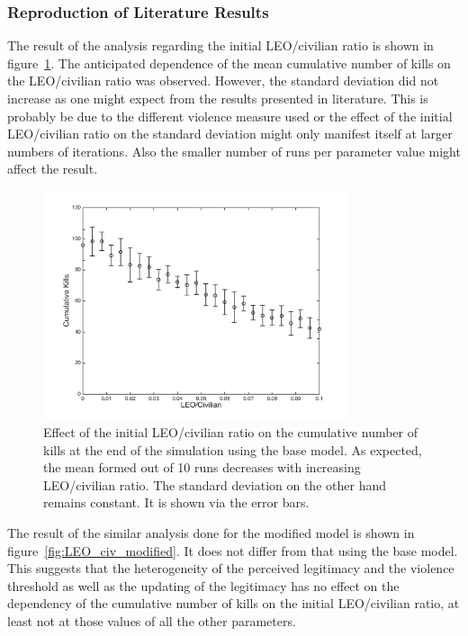 \documentclass[11pt]{article}
\begin{document}
\subsubsection{Reproduction of Literature Results}
The result of the analysis regarding the initial LEO/civilian ratio is shown in figure~\ref{fig:LEO_civ_base}. The anticipated dependence of the mean cumulative number of kills on the LEO/civilian ratio was observed. However, the standard deviation did not increase as one might expect from the results presented in literature. This is probably be due to the different violence measure used or the effect of the initial LEO/civilian ratio on the standard deviation might only manifest itself at larger numbers of iterations. Also the smaller number of runs per parameter value might affect the result.
\begin{figure}[!htbp]
	\centering
		\includegraphics[width=0.80\textwidth]{../../code/base_model/cum_kills_vs_LEO_civ.png}
	\caption{Effect of the initial LEO/civilian ratio on the cumulative number of kills at the end of the simulation using the base model. As expected, the mean formed out of 10 runs decreases with increasing LEO/civilian ratio. The standard deviation on the other hand remains constant. It is shown via the error bars.}
	\label{fig:LEO_civ_base}
\end{figure}
The result of the similar analysis done for the modified model is shown in figure~\ref{fig:LEO_civ_modified}. It does not differ from that using the base model. This suggests that the heterogeneity of the perceived legitimacy and the violence threshold as well as the updating of the legitimacy has no effect on the dependency of the cumulative number of kills on the initial LEO/civilian ratio, at least not at those values of all the other parameters. 
\end{document}
